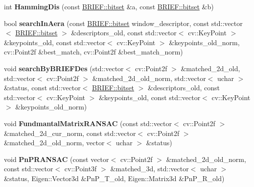 \begin{DoxyCompactItemize}
\item 
\mbox{\label{classKeyFrame_a70c5838cae872deb17638059f23d75a9}} 
int {\bfseries Hamming\+Dis} (const \hyperlink{classDVision_1_1BRIEF_abc56a095174a93b0741099f35230b7c5}{B\+R\+I\+E\+F\+::bitset} \&a, const \hyperlink{classDVision_1_1BRIEF_abc56a095174a93b0741099f35230b7c5}{B\+R\+I\+E\+F\+::bitset} \&b)
\item 
\mbox{\label{classKeyFrame_a9123dc2de5c56ba6029a92b0d86f7dc6}} 
bool {\bfseries search\+In\+Aera} (const \hyperlink{classDVision_1_1BRIEF_abc56a095174a93b0741099f35230b7c5}{B\+R\+I\+E\+F\+::bitset} window\+\_\+descriptor, const std\+::vector$<$ \hyperlink{classDVision_1_1BRIEF_abc56a095174a93b0741099f35230b7c5}{B\+R\+I\+E\+F\+::bitset} $>$ \&descriptors\+\_\+old, const std\+::vector$<$ cv\+::\+Key\+Point $>$ \&keypoints\+\_\+old, const std\+::vector$<$ cv\+::\+Key\+Point $>$ \&keypoints\+\_\+old\+\_\+norm, cv\+::\+Point2f \&best\+\_\+match, cv\+::\+Point2f \&best\+\_\+match\+\_\+norm)
\item 
\mbox{\label{classKeyFrame_a1ae28307d98afe6239e0867feb70bf47}} 
void {\bfseries search\+By\+B\+R\+I\+E\+F\+Des} (std\+::vector$<$ cv\+::\+Point2f $>$ \&matched\+\_\+2d\+\_\+old, std\+::vector$<$ cv\+::\+Point2f $>$ \&matched\+\_\+2d\+\_\+old\+\_\+norm, std\+::vector$<$ uchar $>$ \&status, const std\+::vector$<$ \hyperlink{classDVision_1_1BRIEF_abc56a095174a93b0741099f35230b7c5}{B\+R\+I\+E\+F\+::bitset} $>$ \&descriptors\+\_\+old, const std\+::vector$<$ cv\+::\+Key\+Point $>$ \&keypoints\+\_\+old, const std\+::vector$<$ cv\+::\+Key\+Point $>$ \&keypoints\+\_\+old\+\_\+norm)
\item 
\mbox{\label{classKeyFrame_ad4ba1c7ac182ae1e81f83c2bfe932677}} 
void {\bfseries Fundmantal\+Matrix\+R\+A\+N\+S\+AC} (const std\+::vector$<$ cv\+::\+Point2f $>$ \&matched\+\_\+2d\+\_\+cur\+\_\+norm, const std\+::vector$<$ cv\+::\+Point2f $>$ \&matched\+\_\+2d\+\_\+old\+\_\+norm, vector$<$ uchar $>$ \&status)
\item 
\mbox{\label{classKeyFrame_ade03e174104940fd8a355adc2d814bdf}} 
void {\bfseries Pn\+P\+R\+A\+N\+S\+AC} (const vector$<$ cv\+::\+Point2f $>$ \&matched\+\_\+2d\+\_\+old\+\_\+norm, const std\+::vector$<$ cv\+::\+Point3f $>$ \&matched\+\_\+3d, std\+::vector$<$ uchar $>$ \&status, Eigen\+::\+Vector3d \&Pn\+P\+\_\+\+T\+\_\+old, Eigen\+::\+Matrix3d \&Pn\+P\+\_\+\+R\+\_\+old)

\end{DoxyCompactItemize}
